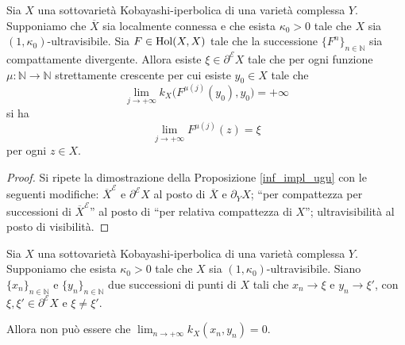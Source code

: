 \begin{prop} \label{unaproppp}
    Sia $X$ una sottovarietà Kobayashi-iperbolica di una varietà complessa $Y$. Supponiamo che $\overline{X}$ sia localmente connessa e che esista $\kappa_0>0$ tale che $X$ sia $(1,\kappa_0)$-ultravisibile. Sia $F\in\textnormal{Hol}(X,X)$ tale che la successione $\{F^n\}_{n\in\mathbb{N}}$ sia compattamente divergente. Allora esiste $\xi\in\partial^\mathcal{E}X$ tale che per ogni funzione $\mu:\mathbb{N}\longrightarrow\mathbb{N}$ strettamente crescente per cui esiste $y_0 \in X$ tale che
    \begin{equation}
        \lim_{j\longrightarrow+\infty} k_X\big(F^{\mu(j)}(y_0),y_0\big)=+\infty
    \end{equation}
    si ha
    \begin{equation}
        \lim_{j\longrightarrow+\infty} F^{\mu(j)}(z)=\xi
    \end{equation}
    per ogni $z \in X$.
\end{prop}

\begin{proof}
    Si ripete la dimostrazione della Proposizione \ref{inf_impl_ugu} con le seguenti modifiche: $\overline{X}^\mathcal{E}$ e $\partial^\mathcal{E}X$ al posto di $\overline{X}$ e $\partial_YX$; ``per compattezza per successioni di $\overline{X}^\mathcal{E}$'' al posto di ``per relativa compattezza di $X$''; ultravisibilità al posto di visibilità.
\end{proof}

\begin{lm} \label{nonazeroplease}
    Sia $X$ una sottovarietà Kobayashi-iperbolica di una varietà complessa $Y$. Supponiamo che esista $\kappa_0>0$ tale che $X$ sia $(1,\kappa_0)$-ultravisibile. Siano $\{x_n\}_{n\in\mathbb{N}}$ e $\{y_n\}_{n\in\mathbb{N}}$ due successioni di punti di $X$ tali che $x_n\longrightarrow\xi$ e $y_n\longrightarrow\xi'$, con $\xi,\xi'\in\partial^\mathcal{E}X$ e $\xi\not=\xi'$.
    
    Allora non può essere che $\displaystyle\lim_{n\longrightarrow+\infty}k_X(x_n,y_n)=0$.
\end{lm}

